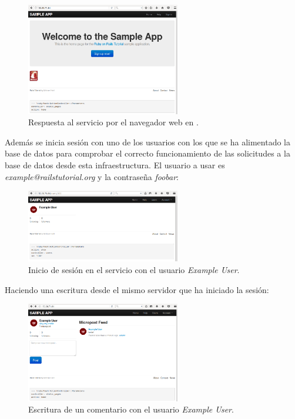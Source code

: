 \begin{figure}[H]
\centering
\includegraphics[width=0.6\textwidth]{images/figures/web-confd.png}
\caption{Respuesta al servicio por el navegador web en . \label{fig:web-confd}}
\end{figure}

Además se inicia sesión con uno de los usuarios con los que se ha alimentado la base de datos para comprobar el correcto funcionamiento de las solicitudes a la base de datos desde esta infraestructura. El usuario a usar es \textit{example@railstutorial.org} y la contraseña \textit{foobar}:

\begin{figure}[H]
\centering
\includegraphics[width=0.6\textwidth]{images/figures/login-confd.png}
\caption{Inicio de sesión en el servicio con el usuario \textit{Example User}.}
\end{figure}

Haciendo una escritura desde el mismo servidor que ha iniciado la sesión:

\begin{figure}[H]
\centering
\includegraphics[width=0.6\textwidth]{images/figures/post-confd.png}
\caption{Escritura de un comentario con el usuario \textit{Example User}.}
\end{figure}

